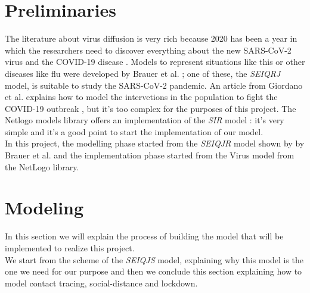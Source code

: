 \documentclass[12pt]{llncs}
\begin{document}
\section{Preliminaries}
The literature about virus diffusion is very rich because 2020 has been a year in which the researchers need to discover everything about the new SARS-CoV-2 virus and the COVID-19 disease \cite{singhal}. Models to represent situations like this or other diseases like flu were developed by Brauer et al. \cite{brauer}; one of these, the \textit{SEIQRJ} model, is suitable to study the SARS-CoV-2 pandemic. An article from Giordano et al. explains how to model the intervetions in the population to fight the COVID-19 outbreak \cite{giordano}, but it's too complex for the purposes of this project. The Netlogo \cite{netlogo} models library offers an implementation of the \textit{SIR} model \cite{netlogo-virus}: it's very simple and it's a good point to start the implementation of our model.\\ 
In this project, the modelling phase started from the \textit{SEIQJR} model shown by by Brauer et al. and the implementation phase started from the Virus model from the NetLogo library.

\section{Modeling}
In this section we will explain the process of building the model that will be implemented to realize this project.\\
We start from the scheme of the \textit{SEIQJS} model, explaining why this model is the one we need for our purpose and then we conclude this section explaining how to model contact tracing, social-distance and lockdown.
\end{document}
